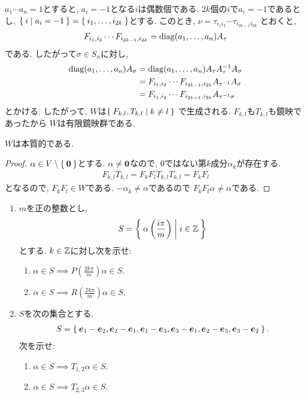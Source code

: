 $a_1\cdots a_n = 1$とすると,
$a_i=-1$となる$i$は偶数個である.
$2k$個の$i$で$a_i=-1$であるとし,
$\Set{i|a_i=-1}=\Set{i_1,\ldots,i_{2k}}$とする.
このとき, $\nu=\tau_{i_1i_2}\cdots \tau_{i_{2k-1}i_{2k}}$
とおくと,
\begin{align*}
F_{i_1,i_2}\cdots F_{i_{2k-1},i_{2k}}=\operatorname{diag}(a_1,\ldots,a_n)A_{\tau}
\end{align*}
である.  したがって$\sigma\in S_n$に対し,
\begin{align*}
  \operatorname{diag}(a_1,\ldots,a_n)A_{\sigma}
  &=\operatorname{diag}(a_1,\ldots,a_n)A_{\tau}A_{\tau}^{-1} A_{\sigma}\\
  &=F_{i_1,i_2}\cdots F_{i_{2k-1},i_{2k}}A_{\tau^{-1}} A_{\sigma}\\
  &=F_{i_1,i_2}\cdots F_{i_{2k-1},i_{2k}}A_{\tau^{-1}\sigma}
\end{align*}
とかける.
したがって, $W$は$\Set{F_{k,l}, T_{k,l}|k\neq l}$
で生成される.
$F_{k,l}$も$T_{k,l}$も鏡映であったから
$W$は有限鏡映群である.


\begin{prop}
$W$は本質的である.
\end{prop}
\begin{proof}
  $\alpha\in V\setminus\Set{\boldsymbol{0}}$とする.
  $\alpha\neq \boldsymbol{0}$なので,
  $0$ではない第$k$成分$\alpha_k$が存在する.
  \begin{align*}
    F_{k,l}T_{k,l}=F_kF_lT_{k,l}T_{k,l}=F_{k}F_{l}
  \end{align*}
  となるので,
  $F_{k}F_{l}\in W$である.
  $-\alpha_k\neq \alpha$であるので
  $F_{k}F_{l}\alpha \neq \alpha$である.
\end{proof}

\begin{enumerate}
\item 
  $m$を正の整数とし,
  \begin{align*}
    S=\Set{
      \alpha\left(\frac{i\pi}{m}\right)
      | i\in\mathbb{Z}}
  \end{align*}
  とする. $k\in\mathbb{Z}$に対し次を示せ:
  \begin{enumerate}
    \item $\alpha\in S\implies P\left(\frac{2k\pi}{m}\right) \alpha\in S$.
    \item $\alpha\in S\implies R\left(\frac{2k\pi}{m}\right) \alpha\in S$.
  \end{enumerate}
\item
  $S$を次の集合とする.
  \begin{align*}
    S=\Set{
      \boldsymbol{e}_1-\boldsymbol{e}_2,
      \boldsymbol{e}_2-\boldsymbol{e}_1,
      \boldsymbol{e}_1-\boldsymbol{e}_3,
      \boldsymbol{e}_3-\boldsymbol{e}_1,
      \boldsymbol{e}_2-\boldsymbol{e}_3,
      \boldsymbol{e}_3-\boldsymbol{e}_2
    }.
  \end{align*}
  次を示せ:
  \begin{enumerate}
    \item $\alpha\in S\implies T_{1,2}\alpha \in S$.
    \item $\alpha\in S\implies T_{2,3}\alpha \in S$.
  \end{enumerate}
\end{enumerate}


